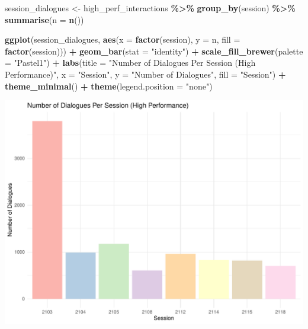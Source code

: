 \documentclass[
]{article}
\newenvironment{Shaded}{\begin{snugshade}}{\end{snugshade}}
\newcommand{\AttributeTok}[1]{\textcolor[rgb]{0.13,0.29,0.53}{#1}}
\newcommand{\FunctionTok}[1]{\textcolor[rgb]{0.13,0.29,0.53}{\textbf{#1}}}
\newcommand{\NormalTok}[1]{#1}
\newcommand{\OtherTok}[1]{\textcolor[rgb]{0.56,0.35,0.01}{#1}}
\newcommand{\SpecialCharTok}[1]{\textcolor[rgb]{0.81,0.36,0.00}{\textbf{#1}}}
\newcommand{\StringTok}[1]{\textcolor[rgb]{0.31,0.60,0.02}{#1}}
\begin{document}
\begin{Shaded}
\begin{Highlighting}[]
\NormalTok{session\_dialogues }\OtherTok{\textless{}{-}}\NormalTok{ high\_perf\_interactions }\SpecialCharTok{\%\textgreater{}\%}
  \FunctionTok{group\_by}\NormalTok{(session) }\SpecialCharTok{\%\textgreater{}\%}
  \FunctionTok{summarise}\NormalTok{(}\AttributeTok{n =} \FunctionTok{n}\NormalTok{())}


\FunctionTok{ggplot}\NormalTok{(session\_dialogues, }\FunctionTok{aes}\NormalTok{(}\AttributeTok{x =} \FunctionTok{factor}\NormalTok{(session), }\AttributeTok{y =}\NormalTok{ n, }\AttributeTok{fill =} \FunctionTok{factor}\NormalTok{(session))) }\SpecialCharTok{+} 
  \FunctionTok{geom\_bar}\NormalTok{(}\AttributeTok{stat =} \StringTok{"identity"}\NormalTok{) }\SpecialCharTok{+}
  \FunctionTok{scale\_fill\_brewer}\NormalTok{(}\AttributeTok{palette =} \StringTok{"Pastel1"}\NormalTok{) }\SpecialCharTok{+}  
  \FunctionTok{labs}\NormalTok{(}\AttributeTok{title =} \StringTok{"Number of Dialogues Per Session (High Performance)"}\NormalTok{,}
       \AttributeTok{x =} \StringTok{"Session"}\NormalTok{,}
       \AttributeTok{y =} \StringTok{"Number of Dialogues"}\NormalTok{,}
       \AttributeTok{fill =} \StringTok{"Session"}\NormalTok{) }\SpecialCharTok{+}
  \FunctionTok{theme\_minimal}\NormalTok{() }\SpecialCharTok{+} 
  \FunctionTok{theme}\NormalTok{(}\AttributeTok{legend.position =} \StringTok{"none"}\NormalTok{) }
\end{Highlighting}
\end{Shaded}

\begin{center}\includegraphics{april_files/figure-latex/unnamed-chunk-2-1} \end{center}
\end{document}
